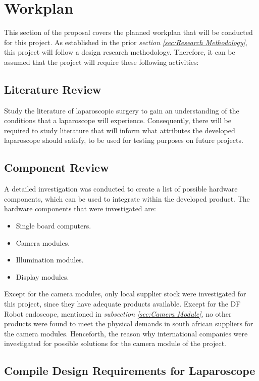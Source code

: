 \section{Workplan}

This section of the proposal covers the planned workplan that will be conducted for this project. As established in the prior \textit{section} \textit{\ref{sec:Research Methodology}}, this project will follow a design research methodology. Therefore, it can be assumed that the project will require these following activities:

\subsection{Literature Review}

Study the literature of laparoscopic surgery to gain an understanding of the conditions that a laparoscope will experience. Consequently, there will be required to study literature that will inform what attributes the developed laparoscope should satisfy, to be used for testing purposes on future projects.

\subsection{Component Review}

A detailed investigation was conducted to create a list of possible hardware components, which can be used to integrate within the developed product. The hardware components that were investigated are:

\begin{itemize}
    \item Single board computers.
    \item Camera modules.
    \item Illumination modules.
    \item Display modules.
\end{itemize}

Except for the camera modules, only local supplier stock were investigated for this project, since they have adequate products available. Except for the DF Robot endoscope, mentioned in \textit{subsection} \textit{\ref{sec:Camera Module}}, no other products were found to meet the physical demands in south african suppliers for the camera modules. Henceforth, the reason why international companies were investigated for possible solutions for the camera module of the project. 

\subsection{Compile Design Requirements for Laparoscope}

